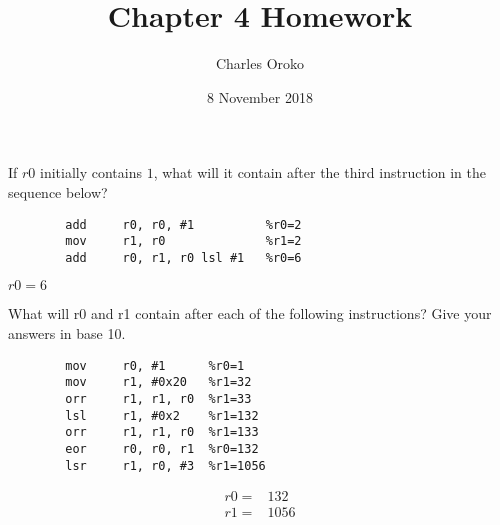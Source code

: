 \documentclass[12pt]{article}
\newenvironment{solution}[2][Solution]{\begin{trivlist}
\item[\hskip \labelsep {\bfseries #1}]}{\end{trivlist}}
\newenvironment{problem}[2][Problem]{\begin{trivlist}
\item[\hskip \labelsep {\bfseries #1}\hskip \labelsep {\bfseries #2.}]}{\end{trivlist}}
\begin{document}
 
 
\title{Chapter 4 Homework}%
\author{Charles Oroko} %
\date{8 November 2018}
\maketitle


\begin{problem}{4.1}
    If $r0$ initially contains $1$, what will it contain after the third instruction in the sequence below?
    \begin{verbatim}
        add     r0, r0, #1          %r0=2
        mov     r1, r0              %r1=2
        add     r0, r1, r0 lsl #1   %r0=6
    \end{verbatim}

\end{problem}

\begin{solution}{}
    $r0=6$
\end{solution}


\begin{problem}{4.2}
    What will r0 and r1 contain after each of the following instructions? Give your answers in base 10.
    \begin{verbatim}
        mov     r0, #1      %r0=1
        mov     r1, #0x20   %r1=32
        orr     r1, r1, r0  %r1=33
        lsl     r1, #0x2    %r1=132
        orr     r1, r1, r0  %r1=133
        eor     r0, r0, r1  %r0=132
        lsr     r1, r0, #3  %r1=1056
    \end{verbatim}

\end{problem}

\begin{solution}{}
    \begin{align*}
        r0 = & 132 \\
        r1 = & 1056
    \end{align*}
\end{solution}
\end{document}
